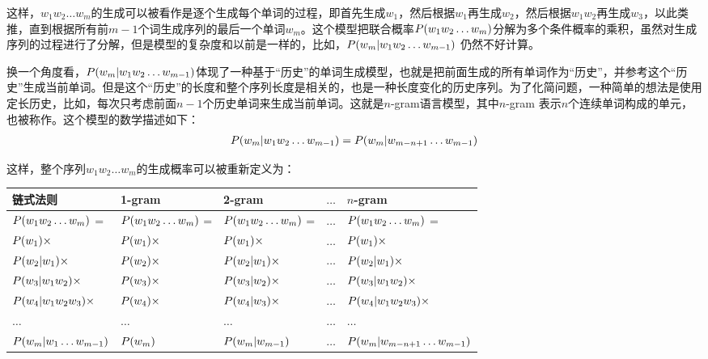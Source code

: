 \parinterval 这样，$w_1 w_2 \ldots w_m$的生成可以被看作是逐个生成每个单词的过程，即首先生成$w_1$，然后根据$w_1$再生成$w_2$，然后根据$w_1 w_2$再生成$w_3$，以此类推，直到根据所有前$m-1$个词生成序列的最后一个单词$w_m$。这个模型把联合概率${P}(w_1 w_2 \ldots w_m)$分解为多个条件概率的乘积，虽然对生成序列的过程进行了分解，但是模型的复杂度和以前是一样的，比如，${P}(w_m|w_1 w_2 \ldots w_{m-1})$ 仍然不好计算。

\parinterval 换一个角度看，${P}(w_m|w_1 w_2 \ldots w_{m-1})$体现了一种基于“历史”的单词生成模型，也就是把前面生成的所有单词作为“历史”，并参考这个“历史”生成当前单词。但是这个“历史”的长度和整个序列长度是相关的，也是一种长度变化的历史序列。为了化简问题，一种简单的想法是使用定长历史，比如，每次只考虑前面$n-1$个历史单词来生成当前单词。这就是$n$-gram语言模型，其中$n$-gram 表示$n$个连续单词构成的单元，也被称作{\small{}}。这个模型的数学描述如下：
\begin{eqnarray}
{P}(w_m|w_1 w_2 \ldots w_{m-1}) = {P}(w_m|w_{m-n+1} \ldots w_{m-1})
\label{eq:2-23}
\end{eqnarray}

\parinterval 这样，整个序列$w_1 w_2 \ldots w_m$的生成概率可以被重新定义为：

\begin{center}
{\footnotesize
\begin{tabular}{l|l|l |l|l}
链式法则 & 1-gram & 2-gram & $ \ldots $ & $n$-gram\\
 \hline
\rule{0pt}{10pt} ${P}(w_1 w_2 \ldots w_m)$ = & ${P}(w_1 w_2 \ldots w_m)$ = & ${P}(w_1 w_2 \ldots w_m)$ = & $ \ldots $ & ${P}(w_1 w_2 \ldots w_m)$ = \\
\rule{0pt}{10pt} ${P}(w_1)\times$ & ${P}(w_1)\times$ & ${P}(w_1)\times$  & $ \ldots $ & ${P}(w_1)\times$ \\
\rule{0pt}{10pt} ${P}(w_2|w_1)\times$ & ${P}(w_2)\times$ & ${P}(w_2|w_1)\times$ & $ \ldots $ & ${P}(w_2|w_1)\times$\\
\rule{0pt}{10pt} ${P}(w_3|w_1 w_2)\times$ & ${P}(w_3)\times$ & ${P}(w_3|w_2)\times$ & $ \ldots $ & ${P}(w_3|w_1 w_2)\times$ \\
\rule{0pt}{10pt} ${P}(w_4|w_1 w_2 w_3)\times$ & ${P}(w_4)\times$ & ${P}(w_4|w_3)\times$ & $ \ldots $ & ${P}(w_4|w_1 w_2 w_3)\times$ \\
\rule{0pt}{10pt} $ \ldots $ & $ \ldots $ & $ \ldots $ & $ \ldots $ & $ \ldots $ \\
\rule{0pt}{10pt} ${P}(w_m|w_1  \ldots  w_{m-1})$ & ${P}(w_m)$ & ${P}(w_m|w_{m-1})$ & $ \ldots $ & ${P}(w_m|w_{m-n+1}  \ldots  w_{m-1})$
\end{tabular}
}
\end{center}

